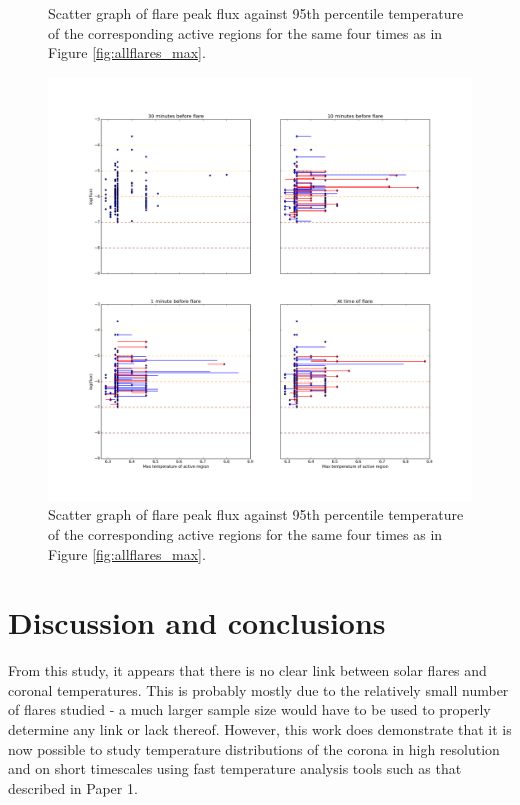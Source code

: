 \documentclass[referee,a4paper,12pt,traditabstract]{swsc}
\begin{document}
\begin{linenumbers}
\begin{figure}
	\caption{Scatter graph of flare peak flux against 95th percentile temperature of the corresponding active regions for the same four times as in Figure \ref{fig:allflares_max}.}
	\label{fig:allflares_p5}
\end{figure}
\begin{figure}
	\centering
		\includegraphics[width=0.9\columnwidth]{tempplotsmax/allflares.png}
	\caption{Scatter graph of flare peak flux against 95th percentile temperature of the corresponding active regions for the same four times as in Figure \ref{fig:allflares_max}.}
	\label{fig:allflares_min}
\end{figure}


\section{Discussion and conclusions}
From this study, it appears that there is no clear link between solar flares and coronal temperatures.
This is probably mostly due to the relatively small number of flares studied - a much larger sample size would have to be used to properly determine any link or lack thereof.
However, this work does demonstrate that it is now possible to study temperature distributions of the corona in high resolution and on short timescales using fast temperature analysis tools such as that described in Paper 1.


\end{linenumbers}
\end{document}
